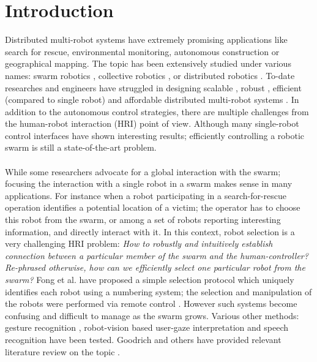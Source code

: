 \documentclass{svmult}
\begin{document}

\section{Introduction}
\label{sec:introduction}
Distributed multi-robot systems have extremely promising applications like search for rescue, environmental monitoring, autonomous construction or geographical mapping. The topic has been extensively studied under various names: swarm robotics \cite{brambilla2013}, collective robotics \cite{kernbach2013handbook}, or distributed robotics \cite{martinoli2012distributed}. To-date researches and engineers have struggled in designing scalable \cite{rubenstein2012kilobot}, robust \cite{winfield2006safety}, efficient (compared to single robot) \cite{Bonani2012} and affordable distributed multi-robot systems \cite{rubenstein2014programmable}. In addition to the autonomous control strategies, there are multiple challenges from the human-robot interaction (HRI) point of view. Although many single-robot control interfaces have shown interesting results; efficiently controlling a robotic swarm is still a state-of-the-art problem.\\
\\
While some researchers advocate for a global interaction with the swarm; focusing the interaction with a single robot in a swarm makes sense in many applications. For instance when a robot participating in a search-for-rescue operation identifies a potential location of a victim; the operator has to choose this robot from the swarm, or among a set of robots reporting interesting information, and directly interact with it. In this context, robot selection is a very challenging HRI problem: \textit{How to robustly and intuitively establish connection between a particular member of the swarm and the human-controller? Re-phrased otherwise, how can we efficiently select one particular robot from the swarm?} Fong et al. have proposed a simple selection protocol which uniquely identifies each robot using a numbering system; the selection and manipulation of the robots were performed via remote control \cite{fong2003}. However such systems become confusing and difficult to manage as the swarm grows. Various other methods: gesture recognition \cite{Couture-Beil2010, Jones2010, Monajjemi2013, Nagietal2014}, robot-vision based user-gaze interpretation \cite{Couture-Beil2010, Monajjemi2013, Pourmehr2013} and speech recognition \cite{Pourmehr2013} have been tested. Goodrich and others have provided relevant literature review on the topic \cite{goodrich2007human, Rule2012, yanco2004classifying}.\\
\end{document}
